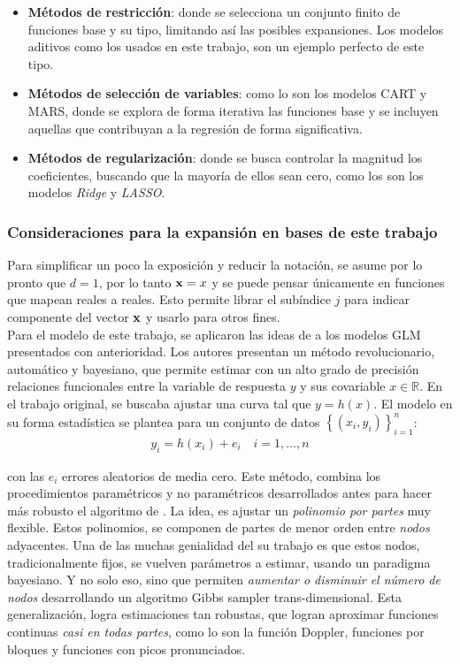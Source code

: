 \documentclass[../Main/Main.tex]{subfiles}
\begin{document}
\begin{itemize}
	\item \textbf{Métodos de restricción}: donde se selecciona un conjunto finito de funciones base y su tipo, limitando así las posibles expansiones. Los modelos aditivos como los usados en este trabajo, son un ejemplo perfecto de este tipo.  
	\item \textbf{Métodos de selección de variables}: como lo son los modelos CART y MARS, donde se explora de forma iterativa las funciones base y se incluyen aquellas que contribuyan a la regresión de forma significativa.
	\item \textbf{Métodos de regularización}: donde se busca controlar la magnitud los coeficientes, buscando que la mayoría de ellos sean cero, como los son los modelos \textit{Ridge} y  \textit{LASSO}.
\end{itemize}

\subsubsection{Consideraciones para la expansión en bases de este trabajo}
Para simplificar un poco la exposición y reducir la notación, se asume por lo pronto que $d = 1$, por lo tanto $\mathbf{x} = x$ y se puede pensar únicamente en funciones que mapean reales a reales. Esto permite librar el subíndice $j$ para indicar componente del vector $\mathbf{x}$ y usarlo para otros fines.\\

Para el modelo de este trabajo, se aplicaron las ideas de \autocite{mallik1998automatic} a los modelos GLM presentados con anterioridad. Los autores presentan un método revolucionario, automático y bayesiano, que permite estimar con un alto grado de precisión relaciones funcionales entre la variable de respuesta $y$ y sus covariable $x\in\mathbb{R}$. En el trabajo original, se buscaba ajustar una curva tal que $y = h(x)$. El modelo en su forma estadística se plantea para un conjunto de datos $\left\{(x_i,y_i) \right\}_{i = 1}^n$:
\begin{align}
	y_i = h(x_i) + e_i \quad i = 1,\ldots,n \label{ec:EstCurvas}
\end{align}

con las $e_i$ errores aleatorios de media cero. Este método, combina   los procedimientos paramétricos y no paramétricos desarrollados antes para hacer más robusto el algoritmo de \autocite{hastie1986generalized}. La idea, es ajustar un \textit{polinomio por partes} muy flexible. Estos polinomios, se componen de partes de menor orden entre \textit{nodos} adyacentes. Una de las muchas genialidad del su trabajo es que estos nodos, tradicionalmente fijos, se vuelven parámetros a estimar, usando un paradigma bayesiano. Y no solo eso, sino que permiten \textit{aumentar o disminuir el número de nodos} desarrollando un algoritmo Gibbs sampler trans-dimensional. Esta generalización, logra estimaciones tan robustas, que logran aproximar funciones continuas \textit{casi en todas partes}, como lo son la función Doppler, funciones por bloques y funciones con picos pronunciados. \\ 
\end{document}
